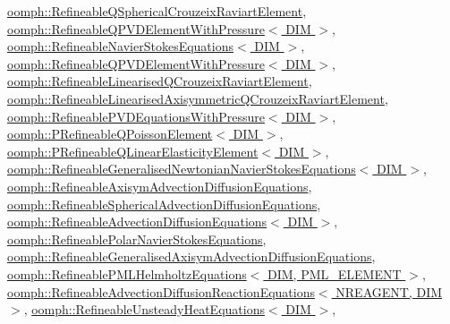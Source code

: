 \hyperlink{classoomph_1_1RefineableQSphericalCrouzeixRaviartElement_a6a67cbea725615b74a5f3a92aa60ebd2}{oomph\+::\+Refineable\+Q\+Spherical\+Crouzeix\+Raviart\+Element}, \hyperlink{classoomph_1_1RefineableQPVDElementWithPressure_ab4406f1c6de1e8e2e704bd55a9409c87}{oomph\+::\+Refineable\+Q\+P\+V\+D\+Element\+With\+Pressure$<$ D\+I\+M $>$}, \hyperlink{classoomph_1_1RefineableNavierStokesEquations_a7afd6250585ea597c3df65b8c7744da4}{oomph\+::\+Refineable\+Navier\+Stokes\+Equations$<$ D\+I\+M $>$}, \hyperlink{classoomph_1_1RefineableQPVDElementWithPressure_af2981a672382c6db25389aa7c82a6b30}{oomph\+::\+Refineable\+Q\+P\+V\+D\+Element\+With\+Pressure$<$ D\+I\+M $>$}, \hyperlink{classoomph_1_1RefineableLinearisedQCrouzeixRaviartElement_a175965274f4f4545e086d19f446c9ce9}{oomph\+::\+Refineable\+Linearised\+Q\+Crouzeix\+Raviart\+Element}, \hyperlink{classoomph_1_1RefineableLinearisedAxisymmetricQCrouzeixRaviartElement_a075e75e685c8d0cd2851b36f6bd865e0}{oomph\+::\+Refineable\+Linearised\+Axisymmetric\+Q\+Crouzeix\+Raviart\+Element}, \hyperlink{classoomph_1_1RefineablePVDEquationsWithPressure_aad92965f2aec749e75580d003eebdc91}{oomph\+::\+Refineable\+P\+V\+D\+Equations\+With\+Pressure$<$ D\+I\+M $>$}, \hyperlink{classoomph_1_1PRefineableQPoissonElement_a953633adeb9bc3875113d3672c7d525f}{oomph\+::\+P\+Refineable\+Q\+Poisson\+Element$<$ D\+I\+M $>$}, \hyperlink{classoomph_1_1PRefineableQLinearElasticityElement_a286182e34bade0d256482bed74e8e77f}{oomph\+::\+P\+Refineable\+Q\+Linear\+Elasticity\+Element$<$ D\+I\+M $>$}, \hyperlink{classoomph_1_1RefineableGeneralisedNewtonianNavierStokesEquations_a53a4c5277d517f5df48df7c1953b2b02}{oomph\+::\+Refineable\+Generalised\+Newtonian\+Navier\+Stokes\+Equations$<$ D\+I\+M $>$}, \hyperlink{classoomph_1_1RefineableAxisymAdvectionDiffusionEquations_aefeb49794d8a5d79e59c9d2145e60795}{oomph\+::\+Refineable\+Axisym\+Advection\+Diffusion\+Equations}, \hyperlink{classoomph_1_1RefineableSphericalAdvectionDiffusionEquations_a77053e6352f6cc7a3c550d7bc4ee8b39}{oomph\+::\+Refineable\+Spherical\+Advection\+Diffusion\+Equations}, \hyperlink{classoomph_1_1RefineableAdvectionDiffusionEquations_a093f39b8be3671828b7018b1f6103c68}{oomph\+::\+Refineable\+Advection\+Diffusion\+Equations$<$ D\+I\+M $>$}, \hyperlink{classoomph_1_1RefineablePolarNavierStokesEquations_ac75e1f0ff50368bd056a8d39c917e35b}{oomph\+::\+Refineable\+Polar\+Navier\+Stokes\+Equations}, \hyperlink{classoomph_1_1RefineableGeneralisedAxisymAdvectionDiffusionEquations_a7a664e8931def11ab00e8f15140f2df2}{oomph\+::\+Refineable\+Generalised\+Axisym\+Advection\+Diffusion\+Equations}, \hyperlink{classoomph_1_1RefineablePMLHelmholtzEquations_a9e3eb293598208404f88bc1c36003d6a}{oomph\+::\+Refineable\+P\+M\+L\+Helmholtz\+Equations$<$ D\+I\+M, P\+M\+L\+\_\+\+E\+L\+E\+M\+E\+N\+T $>$}, \hyperlink{classoomph_1_1RefineableAdvectionDiffusionReactionEquations_aed29fbe38b879562939f96c9403bad50}{oomph\+::\+Refineable\+Advection\+Diffusion\+Reaction\+Equations$<$ N\+R\+E\+A\+G\+E\+N\+T, D\+I\+M $>$}, \hyperlink{classoomph_1_1RefineableUnsteadyHeatEquations_ae39fad9e49a9fa1353c016633f66dc7d}{oomph\+::\+Refineable\+Unsteady\+Heat\+Equations$<$ D\+I\+M $>$}, 